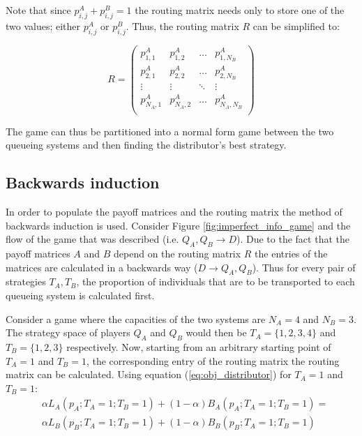 Note that since \(p_{i,j}^A + p_{i,j}^B = 1\) the routing matrix needs only to
store one of the two values; either \(p_{i,j}^A\) or \(p_{i,j}^B\).
Thus, the routing matrix \(R\) can be simplified to:

\begin{equation}\label{eq:routing_matrix_simplified}
    R = 
    \begin{pmatrix}
        p_{1,1}^A & p_{1,2}^A & \dots & p_{1,N_B}^A \\
        p_{2,1}^A & p_{2,2}^A & \dots & p_{2,N_B}^A \\
        \vdots & \vdots & \ddots & \vdots \\
        p_{N_A,1}^A & p_{N_A,2}^A & \dots & p_{N_A,N_B}^A \\
    \end{pmatrix}
\end{equation}

The game can thus be partitioned into a normal form game between the
two queueing systems and then finding the distributor's best strategy. 

\subsection{Backwards induction}

In order to populate the payoff matrices and the routing matrix the method
of backwards induction is used.
Consider Figure \ref{fig:imperfect_info_game} and the flow of the game that was
described (i.e. \(Q_A, Q_B \rightarrow D\)).
Due to the fact that the payoff matrices \(A\) and \(B\) depend on the routing 
matrix \(R\) the entries of the matrices are calculated in a backwards way 
(\(D \rightarrow Q_A, Q_B\)). 
Thus for every pair of strategies \(T_A, T_B\), the proportion of individuals 
that are to be transported to each queueing system is calculated first. 

Consider a game where the capacities of the two systems are \(N_A = 4\) and 
\(N_B = 3\).
The strategy space of players \(Q_A\) and \(Q_B\) would then be 
\(T_A = \{1, 2, 3, 4\}\) and \(T_B = \{1, 2, 3\}\) respectively.
Now, starting from an arbitrary starting point of \(T_A=1\) and \(T_B=1\), the
corresponding entry of the routing matrix the routing matrix can be calculated.
Using equation (\ref{eq:obj_distributor}) for \(T_A=1\) and \(T_B=1\):
\begin{align}
    & \alpha L_A(p_A;T_A=1;T_B=1) + (1 - \alpha) B_A(p_A;T_A=1;T_B=1) = 
    \nonumber \\
    & \alpha L_B(p_B;T_A=1;T_B=1) + (1 - \alpha) B_B(p_B;T_A=1;T_B=1) 
    \label{eq:obj_distributor_1_1}
\end{align}

